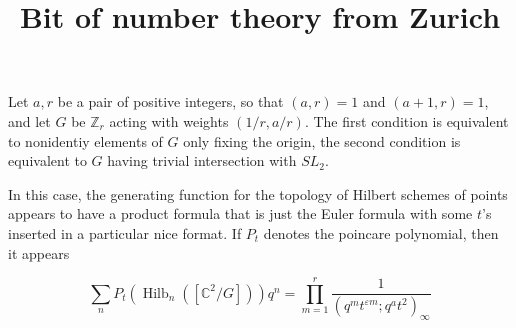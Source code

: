 \documentclass{amsart}
\title{Bit of number theory from Zurich}
\DeclareMathOperator{\Hilb}{Hilb}
\newcommand{\Z}{\mathbb{Z}}
\newcommand{\C}{\mathbb{C}}
\begin{document}
Let $a,r$ be a pair of positive integers, so that $(a,r)=1$ and $(a+1,r)=1$, and let $G$ be $\Z_r$ acting with weights $(1/r, a/r)$.  The first condition is equivalent to nonidentiy elements of $G$ only fixing the origin, the second condition is equivalent to $G$ having trivial intersection with $SL_2$. 

In this case, the generating function for the topology of Hilbert schemes of points appears to have a product formula that is just the Euler formula with some $t$'s inserted in a particular nice format.  If $P_t$ denotes the poincare polynomial, then it appears

$$\sum_{n} P_t(\Hilb_n([\C^2/G]))q^n=\prod_{m=1}^r \frac{1}{(q^mt^{\varepsilon{m}};q^at^2)_\infty}$$
\end{document}
